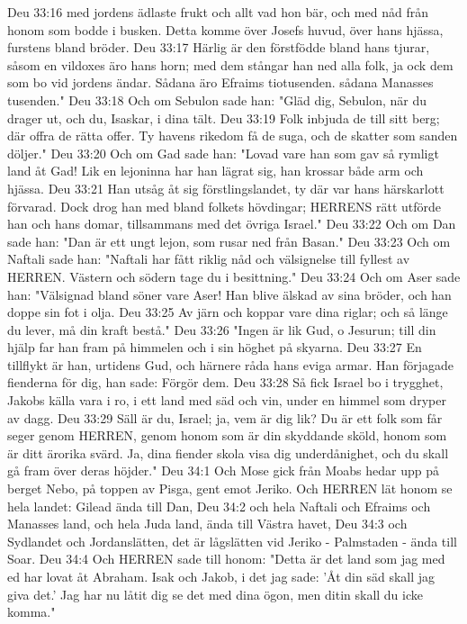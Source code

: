 Deu 33:16  med jordens ädlaste frukt och allt vad hon bär, och med nåd från honom som bodde i busken. Detta komme över Josefs huvud, över hans hjässa, furstens bland bröder.
Deu 33:17  Härlig är den förstfödde bland hans tjurar, såsom en vildoxes äro hans horn; med dem stångar han ned alla folk, ja ock dem som bo vid jordens ändar. Sådana äro Efraims tiotusenden. sådana Manasses tusenden."
Deu 33:18  Och om Sebulon sade han: "Gläd dig, Sebulon, när du drager ut, och du, Isaskar, i dina tält.
Deu 33:19  Folk inbjuda de till sitt berg; där offra de rätta offer. Ty havens rikedom få de suga, och de skatter som sanden döljer."
Deu 33:20  Och om Gad sade han: "Lovad vare han som gav så rymligt land åt Gad! Lik en lejoninna har han lägrat sig, han krossar både arm och hjässa.
Deu 33:21  Han utsåg åt sig förstlingslandet, ty där var hans härskarlott förvarad. Dock drog han med bland folkets hövdingar; HERRENS rätt utförde han och hans domar, tillsammans med det övriga Israel."
Deu 33:22  Och om Dan sade han: "Dan är ett ungt lejon, som rusar ned från Basan."
Deu 33:23  Och om Naftali sade han: "Naftali har fått riklig nåd och välsignelse till fyllest av HERREN. Västern och södern tage du i besittning."
Deu 33:24  Och om Aser sade han: "Välsignad bland söner vare Aser! Han blive älskad av sina bröder, och han doppe sin fot i olja.
Deu 33:25  Av järn och koppar vare dina riglar; och så länge du lever, må din kraft bestå."
Deu 33:26  "Ingen är lik Gud, o Jesurun; till din hjälp far han fram på himmelen och i sin höghet på skyarna.
Deu 33:27  En tillflykt är han, urtidens Gud, och härnere råda hans eviga armar. Han förjagade fienderna för dig, han sade: Förgör dem.
Deu 33:28  Så fick Israel bo i trygghet, Jakobs källa vara i ro, i ett land med säd och vin, under en himmel som dryper av dagg.
Deu 33:29  Säll är du, Israel; ja, vem är dig lik? Du är ett folk som får seger genom HERREN, genom honom som är din skyddande sköld, honom som är ditt ärorika svärd. Ja, dina fiender skola visa dig underdånighet, och du skall gå fram över deras höjder."
Deu 34:1  Och Mose gick från Moabs hedar upp på berget Nebo, på toppen av Pisga, gent emot Jeriko. Och HERREN lät honom se hela landet: Gilead ända till Dan,
Deu 34:2  och hela Naftali och Efraims och Manasses land, och hela Juda land, ända till Västra havet,
Deu 34:3  och Sydlandet och Jordanslätten, det är lågslätten vid Jeriko - Palmstaden - ända till Soar.
Deu 34:4  Och HERREN sade till honom: "Detta är det land som jag med ed har lovat åt Abraham. Isak och Jakob, i det jag sade: 'Åt din säd skall jag giva det.' Jag har nu låtit dig se det med dina ögon, men ditin skall du icke komma."
